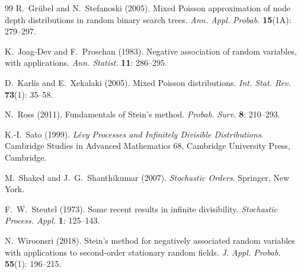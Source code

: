 \documentclass[12pt]{article}
\begin{document}
\begin{thebibliography}{99}
 R.~Gr\"ubel and N.~Stefanoski (2005). Mixed Poisson approximation of node depth distributions in random binary search trees. \emph{Ann. Appl. Probab.} {\bf 15}(1A): 279--297.

 K.~Joag-Dev and F.~Proschan (1983). Negative association of random variables, with applications. \emph{Ann. Statist.} {\bf 11}: 286--295.

 D.~Karlis and E.~Xekalaki (2005). Mixed Poisson distributions. \emph{Int. Stat. Rev.} {\bf 73}(1): 35--58.

 N.~Ross (2011). Fundamentals of Stein's method. \emph{Probab. Surv.} {\bf 8}: 210--293.

 K.-I.~Sato (1999). \emph{L\'evy Processes and Infinitely Divisible Distributions}. Cambridge Studies in Advanced Mathematics 68, Cambridge University Press, Cambridge.

 M.~Shaked and J.~G.~Shanthikumar (2007). \emph{Stochastic Orders}. Springer, New York.

 F.~W.~Steutel (1973). Some recent results in infinite divisibility. \emph{Stochastic Process. Appl.} {\bf 1}: 125--143.

 N.~Wiroonsri (2018). Stein's method for negatively associated random variables with applications to second-order stationary random fields. \emph{J. Appl. Probab.} {\bf 55}(1): 196--215.

\end{thebibliography}
\end{document}
